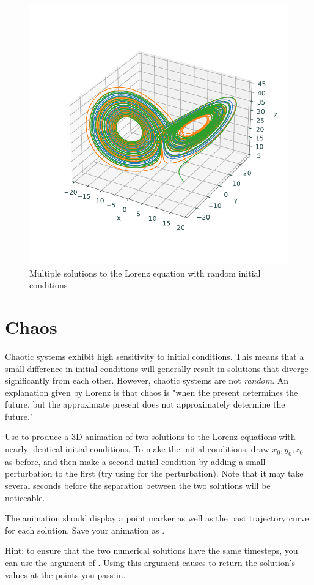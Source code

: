 \begin{figure}
\includegraphics[width=\textwidth]{figures/Multiple_Lorenz.pdf}
\caption{Multiple solutions to the Lorenz equation with random initial conditions}
\label{fig:Multiple_Lorenz}
\end{figure}

\section*{Chaos}
Chaotic systems exhibit high sensitivity to initial conditions. 
This means that a small difference in initial conditions will generally result in solutions that diverge significantly from each other. 
However, chaotic systems are not \textit{random}. 
An explanation given by Lorenz is that chaos is "when the present determines the future, but the approximate present does not approximately determine the future."

\begin{problem}
Use  to produce a 3D animation of two solutions to the Lorenz equations with nearly identical initial conditions. To make the initial conditions, draw $x_0,y_0,z_0$ as before, and then make a second initial condition by adding a small perturbation to the first (try using  for the perturbation). Note that it may take several seconds before the separation between the two solutions will be noticeable.

The animation should display a point marker as well as the past trajectory curve for each solution. 
Save your animation as .

Hint: to ensure that the two numerical solutions have the same timesteps, you can use the  argument of .
Using this argument causes  to return the solution's values at the points you pass in.
\end{problem}

